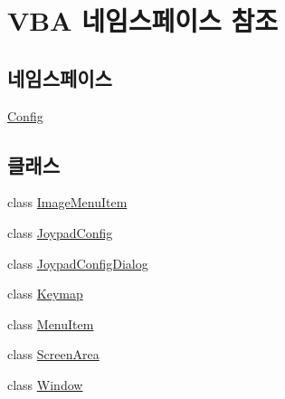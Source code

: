 \hypertarget{namespace_v_b_a}{}\section{V\+BA 네임스페이스 참조}
\label{namespace_v_b_a}
\subsection*{네임스페이스}
\begin{DoxyCompactItemize}
\item 
 \mbox{\hyperlink{namespace_v_b_a_1_1_config}{Config}}
\end{DoxyCompactItemize}
\subsection*{클래스}
\begin{DoxyCompactItemize}
\item 
class \mbox{\hyperlink{class_v_b_a_1_1_image_menu_item}{Image\+Menu\+Item}}
\item 
class \mbox{\hyperlink{class_v_b_a_1_1_joypad_config}{Joypad\+Config}}
\item 
class \mbox{\hyperlink{class_v_b_a_1_1_joypad_config_dialog}{Joypad\+Config\+Dialog}}
\item 
class \mbox{\hyperlink{class_v_b_a_1_1_keymap}{Keymap}}
\item 
class \mbox{\hyperlink{class_v_b_a_1_1_menu_item}{Menu\+Item}}
\item 
class \mbox{\hyperlink{class_v_b_a_1_1_screen_area}{Screen\+Area}}
\item 
class \mbox{\hyperlink{class_v_b_a_1_1_window}{Window}}
\end{DoxyCompactItemize}
